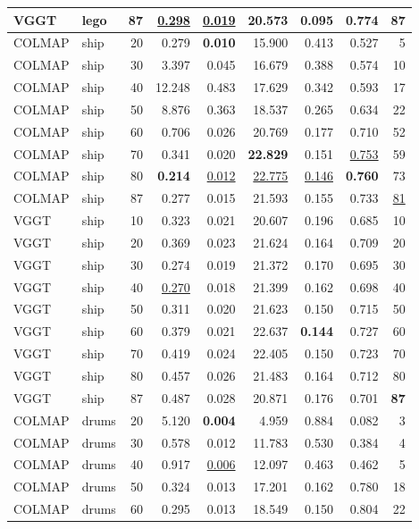 \begin{table}[H]
\begin{tabular}{llrrrrrrr}
VGGT & lego & 87 & \underline{0.298} & \underline{0.019} & 20.573 & 0.095 & 0.774 & \textbf{87} \\
\midrule
COLMAP & ship & 20 & 0.279 & \textbf{0.010} & 15.900 & 0.413 & 0.527 & 5 \\
COLMAP & ship & 30 & 3.397 & 0.045 & 16.679 & 0.388 & 0.574 & 10 \\
COLMAP & ship & 40 & 12.248 & 0.483 & 17.629 & 0.342 & 0.593 & 17 \\
COLMAP & ship & 50 & 8.876 & 0.363 & 18.537 & 0.265 & 0.634 & 22 \\
COLMAP & ship & 60 & 0.706 & 0.026 & 20.769 & 0.177 & 0.710 & 52 \\
COLMAP & ship & 70 & 0.341 & 0.020 & \textbf{22.829} & 0.151 & \underline{0.753} & 59 \\
COLMAP & ship & 80 & \textbf{0.214} & \underline{0.012} & \underline{22.775} & \underline{0.146} & \textbf{0.760} & 73 \\
COLMAP & ship & 87 & 0.277 & 0.015 & 21.593 & 0.155 & 0.733 & \underline{81} \\
VGGT & ship & 10 & 0.323 & 0.021 & 20.607 & 0.196 & 0.685 & 10 \\
VGGT & ship & 20 & 0.369 & 0.023 & 21.624 & 0.164 & 0.709 & 20 \\
VGGT & ship & 30 & 0.274 & 0.019 & 21.372 & 0.170 & 0.695 & 30 \\
VGGT & ship & 40 & \underline{0.270} & 0.018 & 21.399 & 0.162 & 0.698 & 40 \\
VGGT & ship & 50 & 0.311 & 0.020 & 21.623 & 0.150 & 0.715 & 50 \\
VGGT & ship & 60 & 0.379 & 0.021 & 22.637 & \textbf{0.144} & 0.727 & 60 \\
VGGT & ship & 70 & 0.419 & 0.024 & 22.405 & 0.150 & 0.723 & 70 \\
VGGT & ship & 80 & 0.457 & 0.026 & 21.483 & 0.164 & 0.712 & 80 \\
VGGT & ship & 87 & 0.487 & 0.028 & 20.871 & 0.176 & 0.701 & \textbf{87} \\
\midrule
COLMAP & drums & 20 & 5.120 & \textbf{0.004} & 4.959 & 0.884 & 0.082 & 3 \\
COLMAP & drums & 30 & 0.578 & 0.012 & 11.783 & 0.530 & 0.384 & 4 \\
COLMAP & drums & 40 & 0.917 & \underline{0.006} & 12.097 & 0.463 & 0.462 & 5 \\
COLMAP & drums & 50 & 0.324 & 0.013 & 17.201 & 0.162 & 0.780 & 18 \\
COLMAP & drums & 60 & 0.295 & 0.013 & 18.549 & 0.150 & 0.804 & 22 \\

\end{tabular}
\end{table}
